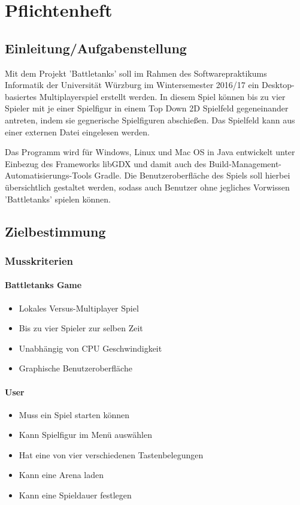 \chapter{Pflichtenheft}
\section{Einleitung/Aufgabenstellung}
Mit dem Projekt 'Battletanks' soll im Rahmen des Softwarepraktikums Informatik der Universität Würzburg im Wintersemester 2016/17 ein Desktop-basiertes Multiplayerspiel erstellt werden.
In diesem Spiel können bis zu vier Spieler mit je einer Spielfigur in einem Top Down 2D Spielfeld gegeneinander antreten, indem sie gegnerische Spielfiguren abschießen.
Das Spielfeld kann aus einer externen Datei eingelesen werden.

Das Programm wird für Windows, Linux und Mac OS in Java entwickelt unter Einbezug des Frameworks libGDX und damit auch des Build-Management-Automatisierungs-Tools Gradle.
Die Benutzeroberfläche des Spiels soll hierbei übersichtlich gestaltet werden, 
sodass auch Benutzer ohne jegliches Vorwissen 'Battletanks' spielen können.

\section{Zielbestimmung}
\subsection{Musskriterien}
\subsubsection{Battletanks Game}
\begin{itemize}
\item Lokales Versus-Multiplayer Spiel
\item Bis zu vier Spieler zur selben Zeit
\item Unabhängig von CPU Geschwindigkeit
\item Graphische Benutzeroberfläche
\end{itemize}
\subsubsection{User}
\begin{itemize}
\item Muss ein Spiel starten können
\item Kann Spielfigur im Menü auswählen
\item Hat eine von vier verschiedenen Tastenbelegungen
\item Kann eine Arena laden
\item Kann eine Spieldauer festlegen

\end{itemize}
